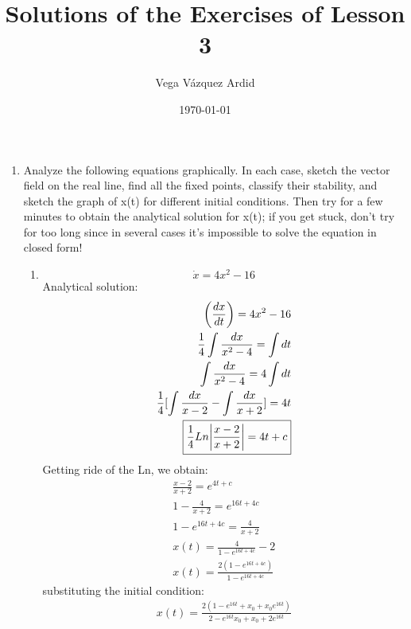 \documentclass[a4paper,10pt]{article}
\title{Solutions of the Exercises of Lesson 3}
\author{Vega Vázquez Ardid}
\date{\today}
\begin{document}
\maketitle

\begin{enumerate}
	\item 
	Analyze the following equations graphically. In each case, sketch the vector field on the real line, find all the fixed points, classify their stability, and sketch the graph of x(t) for different initial conditions. Then try for a few minutes to obtain the analytical solution for x(t); if you get stuck, don’t try for too long since in several cases it’s impossible to solve the equation in closed form!

	\begin{enumerate}
		\item
			\begin{equation}
			    \dot{x}=4x^2-16
			\end{equation}
			Analytical solution:
			\begin{equation}
			    \begin{aligned}
    			    \left( \frac{dx}{dt} \right)=4x^2-16\\
        			\frac{1}{4}\int \frac{dx}{x^2-4}  = \int dt \\
        			\int \frac{dx}{x^2-4} =4\int dt\\
        			\frac{1}{4}[\int \frac{dx}{x-2}-\int \frac{dx}{x+2}]=4t\\
        			\boxed{\frac{1}{4}Ln\abs{\frac{x-2}{x+2}}=4t+c}
        		\end{aligned}
			\end{equation}
			Getting ride of the Ln, we obtain:
			\begin{equation}
			    \begin{aligned}
    			    \frac{x-2}{x+2}=e^{4t+c}\\
    			    1-\frac{4}{x+2}=e^{16t+4c}\\
    			    1-e^{16t+4c}=\frac{4}{x+2}\\
    			    x(t)=\frac{4}{1-e^{16t+4c}}-2\\
    			    \boxed{x(t)=\frac{2(1-e^{16t+4c})}{1-e^{16t+4c}}}
    			 \end{aligned}
    		\end{equation}
    		substituting the initial condition:
    		\begin{equation}
    		    \begin{aligned}
    		        \boxed{x(t)=\frac{2(1-e^{16t}+x_{0} + x_{0}e^{16t})}{2-e^{16t}x_{0}+ x_{0} + 2e^{16t}}}
    		    \end{aligned}
    		\end{equation}
			    

\end{enumerate}
\end{enumerate}
\end{document}
